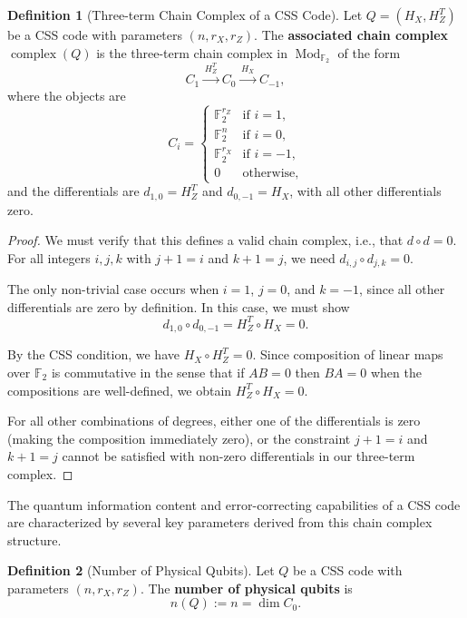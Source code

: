 \documentclass[11pt]{article}
\theoremstyle{plain}
\theoremstyle{definition}
\newtheorem*{definition}{Definition}
\theoremstyle{remark}
\begin{document}
\begin{definition}[Three-term Chain Complex of a CSS Code]
Let $Q = (H_X, H_Z^T)$ be a CSS code with parameters $(n, r_X, r_Z)$. The \textbf{associated chain complex} $\operatorname{complex}(Q)$ is the three-term chain complex in $\operatorname{Mod}_{\mathbb{F}_2}$ of the form
\[
  C_1 \xrightarrow{\,H_Z^T\,} C_0 \xrightarrow{\,H_X\,} C_{-1},
\]
where the objects are
\[
  C_i = \begin{cases} \mathbb{F}_2^{r_Z} & \text{if } i = 1, \\ \mathbb{F}_2^n & \text{if } i = 0, \\ \mathbb{F}_2^{r_X} & \text{if } i = -1, \\ 0 & \text{otherwise,} \end{cases}
\]
and the differentials are $d_{1,0} = H_Z^T$ and $d_{0,-1} = H_X$, with all other differentials zero.
\end{definition}

\begin{proof}
We must verify that this defines a valid chain complex, i.e., that $d \circ d = 0$. For all integers $i, j, k$ with $j + 1 = i$ and $k + 1 = j$, we need $d_{i,j} \circ d_{j,k} = 0$.

The only non-trivial case occurs when $i = 1$, $j = 0$, and $k = -1$, since all other differentials are zero by definition. In this case, we must show
\[
  d_{1,0} \circ d_{0,-1} = H_Z^T \circ H_X = 0.
\]

By the CSS condition, we have $H_X \circ H_Z^T = 0$. Since composition of linear maps over $\mathbb{F}_2$ is commutative in the sense that if $AB = 0$ then $BA = 0$ when the compositions are well-defined, we obtain $H_Z^T \circ H_X = 0$.

For all other combinations of degrees, either one of the differentials is zero (making the composition immediately zero), or the constraint $j + 1 = i$ and $k + 1 = j$ cannot be satisfied with non-zero differentials in our three-term complex.
\end{proof}

The quantum information content and error-correcting capabilities of a CSS code are characterized by several key parameters derived from this chain complex structure.

\begin{definition}[Number of Physical Qubits]
Let $Q$ be a CSS code with parameters $(n, r_X, r_Z)$. The \textbf{number of physical qubits} is
\[
  n(Q) := n = \dim C_0.
\]
\end{definition}
\end{document}
